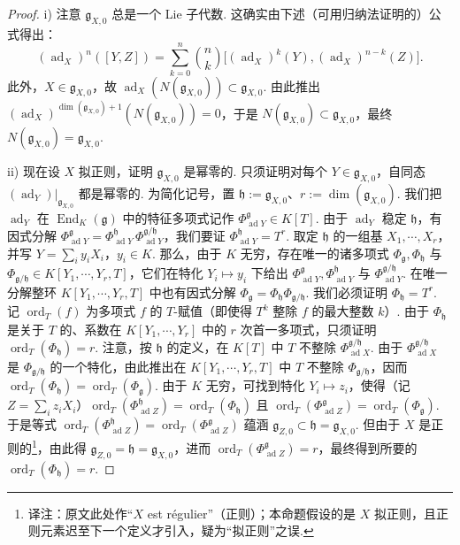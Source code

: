 \begin{proof}
i) 注意 $\mathfrak g_{X,0}$ 总是一个 Lie 子代数. 这确实由下述（可用归纳法证明的）公式得出：
\[(\operatorname{ad}_X)^n([Y,Z])=\sum_{k=0}^n\binom{n}{k}\big[(\operatorname{ad}_X)^k(Y),(\operatorname{ad}_X)^{n-k}(Z)\big].\]
此外，$X\in\mathfrak g_{X,0}$，故 $\operatorname{ad}_X(N(\mathfrak g_{X,0}))\subset\mathfrak g_{X,0}$. 由此推出 $(\operatorname{ad}_X)^{\dim(\mathfrak g_{X,0})+1}(N(\mathfrak g_{X,0}))=0$，于是 $N(\mathfrak g_{X,0})\subset\mathfrak g_{X,0}$，最终 $N(\mathfrak g_{X,0})=\mathfrak g_{X,0}$.

ii) 现在设 $X$ 拟正则，证明 $\mathfrak g_{X,0}$ 是幂零的. 只须证明对每个 $Y\in\mathfrak g_{X,0}$，自同态 $(\operatorname{ad}_Y)|_{\mathfrak g_{X,0}}$ 都是幂零的. 为简化记号，置 $\mathfrak h:=\mathfrak g_{X,0}$、$r:=\dim(\mathfrak g_{X,0})$. 我们把 $\operatorname{ad}_Y$ 在 $\operatorname{End}_K(\mathfrak g)$ 中的特征多项式记作 $\Phi^{\mathfrak g}_{\operatorname{ad}Y}\in K[T]$. 由于 $\operatorname{ad}_Y$ 稳定 $\mathfrak h$，有因式分解 $\Phi^{\mathfrak g}_{\operatorname{ad}Y}=\Phi^{\mathfrak h}_{\operatorname{ad}Y}\,\Phi^{\mathfrak g/\mathfrak h}_{\operatorname{ad}Y}$，我们要证 $\Phi^{\mathfrak h}_{\operatorname{ad}Y}=T^r$. 取定 $\mathfrak h$ 的一组基 $X_1,\cdots,X_r$，并写 $Y=\sum_i y_iX_i$，$y_i\in K$. 那么，由于 $K$ 无穷，存在唯一的诸多项式 $\Phi_{\mathfrak g},\Phi_{\mathfrak h}$ 与 $\Phi_{\mathfrak g/\mathfrak h}\in K[Y_1,\cdots,Y_r,T]$，它们在特化 $Y_i\mapsto y_i$ 下给出 $\Phi^{\mathfrak g}_{\operatorname{ad}Y},\Phi^{\mathfrak h}_{\operatorname{ad}Y}$ 与 $\Phi^{\mathfrak g/\mathfrak h}_{\operatorname{ad}Y}$. 在唯一分解整环 $K[Y_1,\cdots,Y_r,T]$ 中也有因式分解 $\Phi_{\mathfrak g}=\Phi_{\mathfrak h}\Phi_{\mathfrak g/\mathfrak h}$. 我们必须证明 $\Phi_{\mathfrak h}=T^r$. 记 $\operatorname{ord}_T(f)$ 为多项式 $f$ 的 $T$-赋值（即使得 $T^k$ 整除 $f$ 的最大整数 $k$）. 由于 $\Phi_{\mathfrak h}$ 是关于 $T$ 的、系数在 $K[Y_1,\cdots,Y_r]$ 中的 $r$ 次首一多项式，只须证明 $\operatorname{ord}_T(\Phi_{\mathfrak h})=r$. 注意，按 $\mathfrak h$ 的定义，在 $K[T]$ 中 $T$ 不整除 $\Phi^{\mathfrak g/\mathfrak h}_{\operatorname{ad}X}$. 由于 $\Phi^{\mathfrak g/\mathfrak h}_{\operatorname{ad}X}$ 是 $\Phi_{\mathfrak g/\mathfrak h}$ 的一个特化，由此推出在 $K[Y_1,\cdots,Y_r,T]$ 中 $T$ 不整除 $\Phi_{\mathfrak g/\mathfrak h}$，因而 $\operatorname{ord}_T(\Phi_{\mathfrak h})=\operatorname{ord}_T(\Phi_{\mathfrak g})$. 由于 $K$ 无穷，可找到特化 $Y_i\mapsto z_i$，使得（记 $Z=\sum_i z_iX_i$）$\operatorname{ord}_T(\Phi^{\mathfrak h}_{\operatorname{ad}Z})=\operatorname{ord}_T(\Phi_{\mathfrak h})$ 且 $\operatorname{ord}_T(\Phi^{\mathfrak g}_{\operatorname{ad}Z})=\operatorname{ord}_T(\Phi_{\mathfrak g})$. 于是等式 $\operatorname{ord}_T(\Phi^{\mathfrak h}_{\operatorname{ad}Z})=\operatorname{ord}_T(\Phi^{\mathfrak g}_{\operatorname{ad}Z})$ 蕴涵 $\mathfrak g_{Z,0}\subset\mathfrak h=\mathfrak g_{X,0}$. 但由于 $X$ 是正则的\footnote{译注：原文此处作``$X$ est régulier''（正则）；本命题假设的是 $X$ 拟正则，且正则元素迟至下一个定义才引入，疑为``拟正则''之误.}，由此得 $\mathfrak g_{Z,0}=\mathfrak h=\mathfrak g_{X,0}$，进而 $\operatorname{ord}_T(\Phi^{\mathfrak g}_{\operatorname{ad}Z})=r$，最终得到所要的 $\operatorname{ord}_T(\Phi_{\mathfrak h})=r$.


\end{proof}
